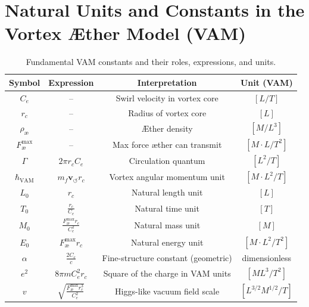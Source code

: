 \section{Natural Units and Constants in the Vortex Æther Model (VAM)}
\renewcommand{\arraystretch}{1.3}
\begin{table}[H]
    \centering
    \footnotesize
    \caption{Fundamental VAM constants and their roles, expressions, and units.}
    \begin{tabular}{|c|c|c|c|}
        \hline
        \textbf{Symbol} & \textbf{Expression} & \textbf{Interpretation} & \textbf{Unit (VAM)} \\
        \hline
        $C_e$ & -- & Swirl velocity in vortex core & $[L/T]$ \\
        \hline
        $r_c$ & -- & Radius of vortex core & $[L]$ \\
        \hline
        $\rho_\text{\ae}$ & -- & Æther density & $[M/L^3]$ \\
        \hline
        $F^{\text{max}}_{\text{\ae}}$ & -- & Max force æther can transmit & $[M \cdot L / T^2]$ \\
        \hline
        $\Gamma$ & $2\pi r_c C_e$ & Circulation quantum & $[L^2 / T]$ \\
        \hline
        $\hbar_\text{VAM}$ & $m_f \mathbf{v}_{\scriptscriptstyle\boldsymbol{\circlearrowleft}} r_c$ & Vortex angular momentum unit & $[M \cdot L^2 / T]$ \\
        \hline
        $L_0$ & $r_c$ & Natural length unit & $[L]$ \\
        \hline
        $T_0$ & $\frac{r_c}{C_e}$ & Natural time unit & $[T]$ \\
        \hline
        $M_0$ & $\frac{F^{\text{max}}_{\text{\ae}} r_c}{C_e^2}$ & Natural mass unit & $[M]$ \\
        \hline
        $E_0$ & $F^{\text{max}}_{\text{\ae}} r_c$ & Natural energy unit & $[M \cdot L^2 / T^2]$ \\
        \hline
        $\alpha$ & $\frac{2 C_e}{c}$ & Fine-structure constant (geometric) & dimensionless \\
        \hline
        $e^2$ & $8\pi m C_e^2 r_c$ & Square of the charge in VAM units & $[M L^3 / T^2]$ \\
        \hline
        $v$ & $\sqrt{\frac{F^{\text{max}}_{\text{\ae}} r_c^3}{C_e^2}}$ & Higgs-like vacuum field scale & $[L^{3/2} M^{1/2} / T]$ \\
        \hline
    \end{tabular}
    \label{tab:VAM_constants_summary}
\end{table}